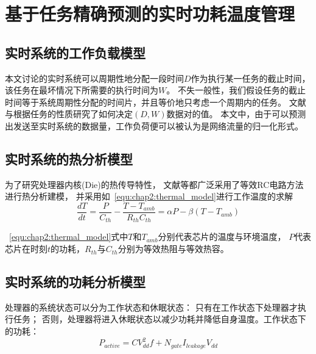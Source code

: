 


\chapter{基于任务精确预测的实时功耗温度管理}
\label{cha:DPTM}

\section{实时系统的工作负载模型}
\label{sec:workload}
本文讨论的实时系统可以周期性地分配一段时间$D$作为执行某一任务的截止时间，该任务在最坏情况下所需要的执行时间为$W$。 不失一般性，我们假设任务的截止时间等于系统周期性分配的时间片，并且等价地只考虑一个周期内的任务。 文献与根据任务的性质研究了如何决定$(D,W)$数据对的值。 本文中，由于可以预测出发送至实时系统的数据量，工作负荷便可以被认为是网络流量的归一化形式。


\section{实时系统的热分析模型}
\label{thermal}
为了研究处理器内核(Die)的热传导特性， 文献等都广泛采用了等效RC电路方法进行热分析建模， 并采用如~\ref{equ:chap2:thermal_model}进行工作温度的求解
\begin{equation}
\label{equ:chap2:thermal_model}
\frac{dT}{dt} = \frac{P}{C_{th}}-\frac{T-T_{amb}}{R_{th}C_{th}} = \alpha P -\beta (T-T_{amb})
\end{equation}

~\ref{equ:chap2:thermal_model}式中$T$和$T_{amb}$分别代表芯片的温度与环境温度， $P$代表芯片在时刻$t$的功耗，$R_{th}$与$C_{th}$分别为等效热阻与等效热容。


\section{实时系统的功耗分析模型}
\label{power}

处理器的系统状态可以分为工作状态和休眠状态： 只有在工作状态下处理器才执行任务； 否则，处理器将进入休眠状态以减少功耗并降低自身温度。工作状态下的功耗：
\begin{equation}
\label{equ:chap2:active_power}
P_{active} = CV_{dd}^2f+N_{gate}I_{leakage}V_{dd}
\end{equation}


